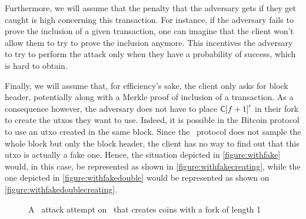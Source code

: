     Furthermore, we will assume that the penalty that the adversary gets if they get caught is high concerning this transaction. For instance, if the adversary fails to prove the inclusion of a given transaction, one can imagine that the client won't allow them to try to prove the inclusion anymore. This incentives the adversary to try to perform the attack only when they have a probability of success, which is hard to obtain.
    
    Finally, we will assume that, for efficiency's sake, the client only asks for block header, potentially along with a Merkle proof of inclusion of a transaction. As a consequence however, the adversary does not have to place \(\mathsf{C[}f+1\mathsf{]}'\) in their fork to create the \glspl{utxo} they want to use. Indeed, it is possible in the Bitcoin protocol to use an \gls{utxo} created in the same block. Since the \FC\ protocol does not sample the whole block but only the block header, the client has no way to find out that this \gls{utxo} is actually a fake one. Hence, the situation depicted in \autoref{figure:withfake} would, in this case, be represented as shown in \autoref{figure:withfakecreating}, while the one depicted in \autoref{figure:withfakedouble} would be represented as shown on \autoref{figure:withfakedoublecreating}.
    
    \begin{figure}[ht]
        \centering
          \caption{A \cs\ attack attempt on \FC\ that creates coins with a fork of length 1}
          \label{figure:withfakecreating}
        \end{figure}
        
